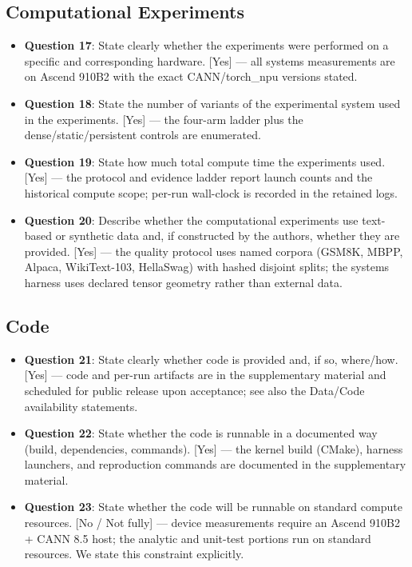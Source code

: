 \subsection*{Computational Experiments}
\begin{itemize}
  \item \textbf{Question 17}: State clearly whether the experiments were
  performed on a specific and corresponding hardware.
  [Yes] — all systems measurements are on Ascend 910B2 with the exact
  CANN/torch\_npu versions stated.
  \item \textbf{Question 18}: State the number of variants of the
  experimental system used in the experiments.
  [Yes] — the four-arm ladder plus the dense/static/persistent controls
  are enumerated.
  \item \textbf{Question 19}: State how much total compute time the
  experiments used.
  [Yes] — the protocol and evidence ladder report launch counts and the
  historical compute scope; per-run wall-clock is recorded in the retained
  logs.
  \item \textbf{Question 20}: Describe whether the computational experiments
  use text-based or synthetic data and, if constructed by the authors,
  whether they are provided.
  [Yes] — the quality protocol uses named corpora (GSM8K, MBPP, Alpaca,
  WikiText-103, HellaSwag) with hashed disjoint splits; the systems harness
  uses declared tensor geometry rather than external data.
\end{itemize}

\subsection*{Code}
\begin{itemize}
  \item \textbf{Question 21}: State clearly whether code is provided and,
  if so, where/how.
  [Yes] — code and per-run artifacts are in the supplementary material and
  scheduled for public release upon acceptance; see also the Data/Code
  availability statements.
  \item \textbf{Question 22}: State whether the code is runnable in a
  documented way (build, dependencies, commands).
  [Yes] — the kernel build (CMake), harness launchers, and reproduction
  commands are documented in the supplementary material.
  \item \textbf{Question 23}: State whether the code will be runnable on
  standard compute resources.
  [No / Not fully] — device measurements require an Ascend 910B2 + CANN 8.5
  host; the analytic and unit-test portions run on standard resources. We
  state this constraint explicitly.
\end{itemize}
